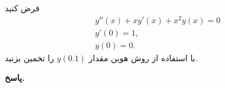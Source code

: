 فرض کنید
\begin{align*}
	&y'' (x) +xy'(x) + x^2y(x) =0\\
	&y'(0) = 1,\\
	&y(0) = 0.
\end{align*}
با استفاده از روش هوین مقدار 
\(y(0.1)\)
را تخمین بزنید.

\begin{answer}
	
	\textbf{پاسخ.}
	
\end{answer}